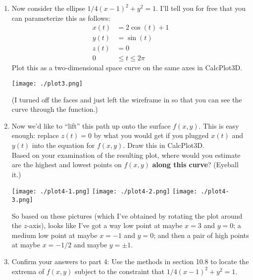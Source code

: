 \documentclass[10pt]{article}
\newenvironment{red}{\color{red}}{\ignorespacesafterend}
\begin{document}
\begin{enumerate}[leftmargin=0pt]
    \item Now consider the ellipse $1/4 (x-1)^2 + y^2 = 1$. I'll tell you for free that you can parameterize this as follows:
    \begin{align*}
        x(t) &= 2 \cos(t) + 1\\
        y(t) &= \sin(t) \\
        z(t) &= 0 \\
        0 &\leq t \leq 2\pi
    \end{align*}
    Plot this as a two-dimensional space curve on the same axes in CalcPlot3D.
    \begin{center}
        \texttt{[image: ./plot3.png]}
    \end{center}
    \begin{red}
    (I turned off the faces and just left the wireframe in so that you can see the curve through the function.)
    \end{red}
    
    \item Now we'd like to ``lift'' this path up onto the surface $f(x, y)$. This is easy enough: replace $z(t) = 0$ by what you would get if you plugged $x(t)$ and $y(t)$ into the equation for $f(x, y)$. Draw this in CalcPlot3D. \\
    Based on your examination of the resulting plot, where would you estimate are the highest and lowest points on $f(x, y)$ \textbf{along this curve}? (Eyeball it.)
    
    \begin{center}
\texttt{[image: ./plot4-1.png]}
\texttt{[image: ./plot4-2.png]}
\texttt{[image: ./plot4-3.png]}
    \end{center}
    
    \begin{red}
    So based on these pictures (which I've obtained by rotating the plot around the $z$-axis), looks like I've got a way low point at maybe $x=3$ and $y=0$; a medium low point at maybe $x=-1$ and $y=0$; and then a pair of high points at maybe $x=-1/2$ and maybe $y=\pm 1$.
    \end{red}
    
    \item Confirm your answers to part 4: Use the methods in section 10.8 to locate the extrema of $f(x, y)$ subject to the constraint that $1/4 (x-1)^2 + y^2 = 1$.
    

\end{enumerate}
\end{document}

